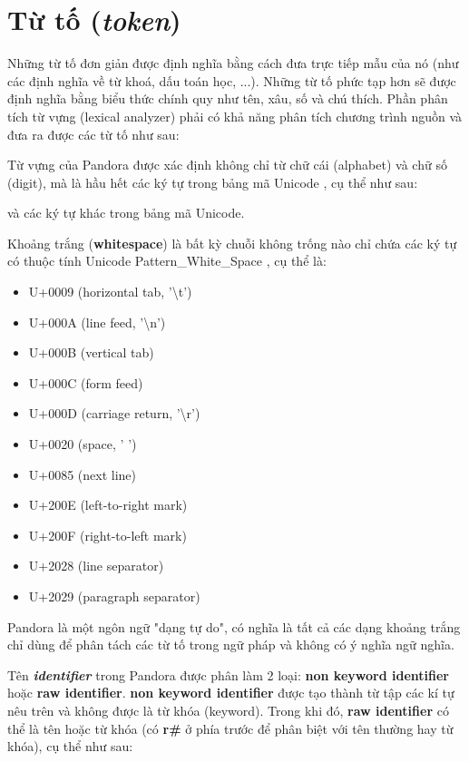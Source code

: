 \section{Từ tố (\textit{token})}
    Những từ tố đơn giản được định nghĩa bằng cách đưa trực tiếp mẫu của
nó (như các định nghĩa về từ khoá, dấu toán học, ...). Những từ tố phức tạp
hơn sẽ được định nghĩa bằng biểu thức chính quy như tên, xâu, số và chú thích.
Phần phân tích từ vựng (lexical analyzer) phải có khả năng phân tích chương trình nguồn
và đưa ra được các từ tố như sau:



    Từ vựng của Pandora được xác định không chỉ từ chữ cái (alphabet) và chữ số (digit), mà là hầu hết các ký tự trong bảng mã Unicode \cite{allen2012unicode}, cụ thể như sau:

    \regexdigit

    \regexalphabet

\noindent và các ký tự khác trong bảng mã Unicode.

    Khoảng trắng (\textbf{whitespace}) là bất kỳ chuỗi không trống nào chỉ chứa các ký tự có thuộc tính Unicode Pattern\_White\_Space \cite{web:unicode:report}, cụ thể là:
    \begin{itemize}
        \item{U+0009 (horizontal tab, '\textbackslash t')}
        \item{U+000A (line feed, '\textbackslash n')}
        \item{U+000B (vertical tab)}
        \item{U+000C (form feed)}
        \item{U+000D (carriage return, '\textbackslash r')}
        \item{U+0020 (space, ' ')}
        \item{U+0085 (next line)}
        \item{U+200E (left-to-right mark)}
        \item{U+200F (right-to-left mark)}
        \item{U+2028 (line separator)}
        \item{U+2029 (paragraph separator)}
    \end{itemize}
\noindent Pandora là một ngôn ngữ "dạng tự do", có nghĩa là tất cả các dạng khoảng trắng chỉ dùng để phân tách các từ tố trong ngữ pháp và không có ý nghĩa ngữ nghĩa.

    Tên \textbf{\textit{identifier}} trong Pandora được phân làm 2 loại: \textbf{non keyword identifier} hoặc \textbf{raw identifier}. \textbf{non keyword identifier} được tạo thành từ tập các kí tự nêu trên và không được là từ khóa (keyword). Trong khi đó, \textbf{raw identifier} có thể là tên hoặc từ khóa (có \textbf{r\#} ở phía trước để phân biệt với tên thường hay từ khóa), cụ thể như sau:

